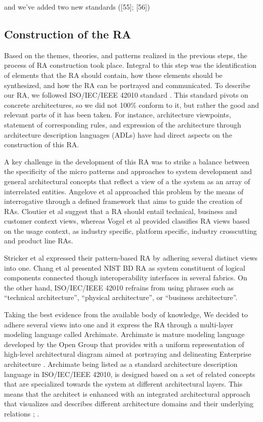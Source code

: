 \documentclass[review]{elsarticle}
\begin{document}
    and we’ve added two new standards ([55]; [56]) 

\subsection{Construction of the RA}

Based on the themes, theories, and patterns realized in the previous steps, the process of RA construction took place. Integral to this step was the identification of elements that the RA should contain, how these elements should be synthesized, and how the RA can be portrayed and communicated. To describe our RA, we followed ISO/IEC/IEEE 42010 standard \cite{ISO42010}. This standard pivots on concrete architectures, so we did not 100\% conform to it, but rather the good and relevant parts of it has been taken. For instance, architecture viewpoints, statement of corresponding rules, and expression of the architecture through architecture description languages (ADLs) have had direct aspects on the construction of this RA.

A key challenge in the development of this RA was to strike a balance between the specificity of the micro patterns and approaches to system development and general architectural concepts that reflect a view of a the system as an array of interrelated entities. Angelove et al \cite{angelov2012framework} approached this problem by the means of interrogative through a defined framework that aims to guide the creation of RAs.
Cloutier et al \cite{Cloutier} suggest that a RA should entail technical, business and customer context views, whereas Vogel et al \cite{vogel2009software} provided classifies RA views based on the usage context, as industry specific, platform specific, industry crosscutting and product line RAs. 

Stricker et al \cite{Stricker} expressed their pattern-based RA by adhering several distinct views into one. Chang et al \cite{Chang} presented NIST BD RA as system constituent of logical components connected though interoperability interfaces in several fabrics. On the other hand, ISO/IEC/IEEE 42010 refrains from using phrases such as “technical architecture”, “physical architecture”, or “business architecture”. 

Taking the best evidence from the available body of knowledge, We decided to adhere several views into one and it express the RA through a multi-layer modeling language called Archimate. Archimate is mature modeling language developed by the Open Group that provides with a uniform representation of high-level architectural diagram aimed at portraying and delineating Enterprise architecture \cite{lankhorst2013language}. Archimate being listed as a standard architecture description language in ISO/IEC/IEEE 42010, is designed based on a set of related concepts that are specialized towards the system at different architectural layers. This means that the architect is enhanced with an integrated architectural approach that visualizes and describes different architecture domains and their underlying relations \cite{lankhorst2010anatomy}; \cite{engelsman2011extending}. 
\end{document}
